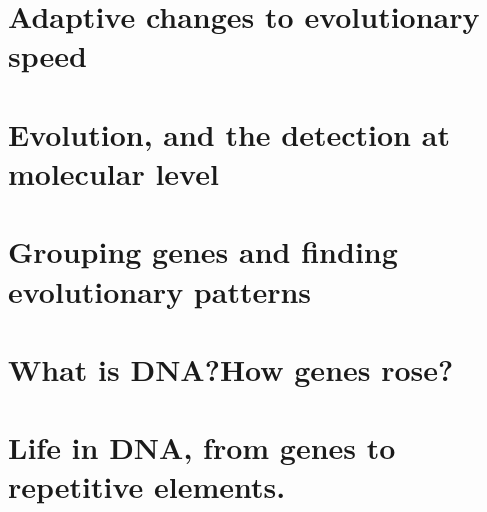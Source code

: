 

\section{Adaptive changes to evolutionary speed}
\section{Evolution, and the detection at molecular level}
\section{Grouping genes and finding evolutionary patterns}
\section{What is DNA?\@ How genes rose?}
\section{Life in DNA, from genes to repetitive elements.}
